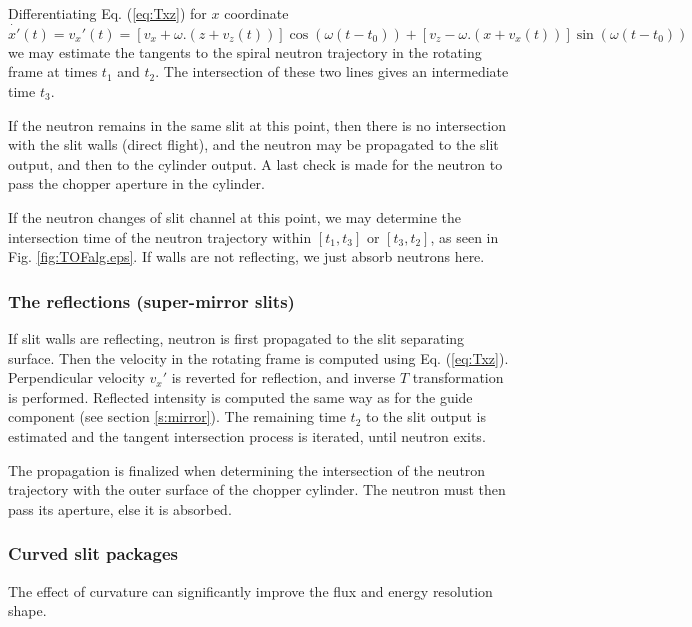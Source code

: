 Differentiating Eq. (\ref{eq:Txz}) for $x$ coordinate
\begin{equation}
\dot{x'}(t) = v_x'(t) = [v_x+\omega.(z+v_z(t))]\cos(\omega(t-t_0))
+ [v_z-\omega.(x+v_x(t))]\sin(\omega(t-t_0))
\end{equation}
we may estimate the tangents to the spiral neutron trajectory in the rotating frame at times $t_1$ and $t_2$. The intersection of these two lines gives an intermediate time $t_3$.

If the neutron remains in the same slit at this point, then there is no intersection with the slit walls (direct flight), and the neutron may be propagated to the slit output, and then to the cylinder output. A last check is made for the neutron to pass the chopper aperture in the cylinder.

If the neutron changes of slit channel at this point, we may determine the intersection time of the neutron trajectory within $[ t_1, t_3 ]$ or $[ t_3, t_2 ]$, as seen in Fig. \ref{fig:TOFalg.eps}. If walls are not reflecting, we just absorb neutrons here.

\subsubsection{The reflections (super-mirror slits)}

If slit walls are reflecting, neutron is first propagated to the slit separating surface. Then the velocity in the rotating frame is computed using Eq. (\ref{eq:Txz}). Perpendicular velocity $v_x'$ is reverted for reflection, and inverse $T$ transformation is performed. Reflected intensity is computed the same way as for the guide component (see section \ref{s:mirror}). The remaining time $t_2$ to the slit output is estimated and the tangent intersection process is iterated, until neutron exits.

The propagation is finalized when determining the intersection of the neutron trajectory with the outer surface of the chopper cylinder. The neutron must then pass its aperture, else it is absorbed.

\subsubsection{Curved slit packages}

The effect of curvature can significantly improve the flux and energy resolution shape.

